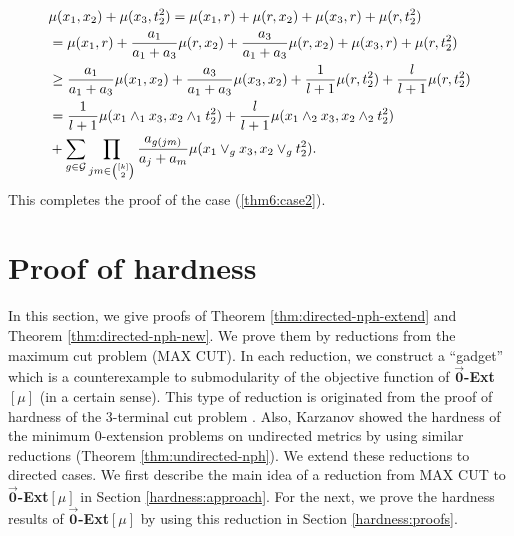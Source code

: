 \documentclass[11pt]{article}
\theoremstyle{definition}
\begin{document}
\begin{align}
    &\mu(x_1,x_2)+\mu(x_3,t_2^2)=\mu(x_1,r)+\mu(r,x_2)+\mu(x_3,r)+\mu(r,t_2^2)\notag\\
    &=\mu(x_1,r)+\frac{a_1}{a_1+a_3}\mu(r,x_2)+\frac{a_3}{a_1+a_3}\mu(r,x_2)+\mu(x_3,r)+\mu(r,t_2^2)\notag\\
    &\geq \frac{a_1}{a_1+a_3} \mu(x_1,x_2)+\frac{a_3}{a_1+a_3}\mu(x_3,x_2)+\frac{1}{l+1}\mu(r,t_2^2)+\frac{l}{l+1}\mu(r,t_2^2)\notag\\
    &=\frac{1}{l+1}\mu(x_1\wedge_1 x_3,x_2\wedge_1 t_2^2)+\frac{l}{l+1}\mu(x_1\wedge_2 x_3,x_2\wedge_2 t_2^2)\notag\\
    &+\sum_{g\in \mathcal{G}}\prod_{\tiny jm\in
\begin{pmatrix}
[k] \\
2 \\
\end{pmatrix}\normalsize}\frac{a_{g(jm)}}{a_j+a_m}\mu(x_1\vee_g x_3,x_2\vee_g t_2^2).
\end{align}
This completes the proof of the case (\ref{thm6:case2}).

\section{Proof of hardness}
\label{sec:proof of hardness}
In this section, we give proofs of Theorem \ref{thm:directed-nph-extend} and Theorem \ref{thm:directed-nph-new}. We prove them by reductions from the maximum cut problem (MAX CUT). In each reduction, we construct a ``gadget'' which is a counterexample to submodularity of the objective function of $\overrightarrow{\textbf{0}}$\textbf{-Ext}$[\mu]$ (in a certain sense). This type of reduction is originated from the proof of hardness of the 3-terminal cut problem \cite{dahlhaus1994}. Also, Karzanov \cite{karzanov1998, karzanov2004} showed the hardness of the minimum 0-extension problems on undirected metrics by using similar reductions (Theorem \ref{thm:undirected-nph}). We extend these reductions to directed cases. We first describe the main idea of a reduction from MAX CUT to $\overrightarrow{\textbf{0}}$\textbf{-Ext}$[\mu]$ in Section \ref{hardness:approach}. For the next, we prove the hardness results of $\overrightarrow{\textbf{0}}$\textbf{-Ext}$[\mu]$ by using this reduction in Section \ref{hardness:proofs}.
\end{document}
